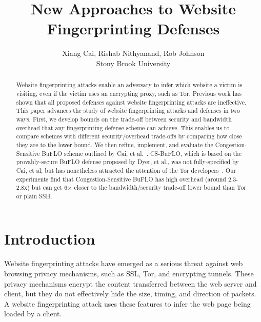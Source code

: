 \documentclass[10pt,journal]{IEEEtran}
\newcommand{\buflo} {BuFLO\xspace}
\newcommand{\csbuflo} {Congestion-Sensitive BuFLO\xspace}
\newcommand{\csb} {CS-BuFLO\xspace}
\begin{document}
\title{New Approaches to Website Fingerprinting Defenses}

\author{Xiang Cai, Rishab Nithyanand, Rob Johnson\\Stony Brook University}
\date{}

\maketitle

\begin{abstract}
  Website fingerprinting attacks\cite{hintz-pets02} enable an
  adversary to infer which website a victim is visiting, even if the
  victim uses an encrypting proxy, such as Tor\cite{tor-website}.
  Previous work has shown that all proposed defenses against website
  fingerprinting attacks are ineffective\cite{dyer-snp12,cai-ccs12}.
  This paper advances the study of website fingerprinting attacks and
  defenses in two ways.  First, we develop bounds on the trade-off
  between security and bandwidth overhead that any fingerprinting
  defense scheme can achieve.  This enables us to compare schemes with
  different security/overhead trade-offs by comparing how close they
  are to the lower bound.  We then refine, implement, and evaluate the
  \csbuflo scheme outlined by Cai, et al.~\cite{cai-ccs12}.  \csb,
  which is based on the provably-secure \buflo defense proposed by
  Dyer, et al.\cite{dyer-snp12}, was not fully-specified by Cai, et
  al, but has nonetheless attracted the attention of the Tor
  developers~\cite{perry-critique,perry-tbdesign}.  Our experiments
  find that \csbuflo has high overhead (around 2.3-2.8x) but can get
  6$\times$ closer to the bandwidth/security trade-off lower bound
  than Tor or plain SSH.
\end{abstract}



\section{Introduction}
\label{sec:introduction}

Website fingerprinting attacks have emerged as a serious threat
against web browsing privacy mechanisms, such as SSL, Tor, and
encrypting tunnels.  These privacy mechanisms encrypt the content
transferred between the web server and client, but they do not
effectively hide the size, timing, and direction of packets.  A
website fingerprinting attack uses these features to infer the web
page being loaded by a client.
\end{document}
